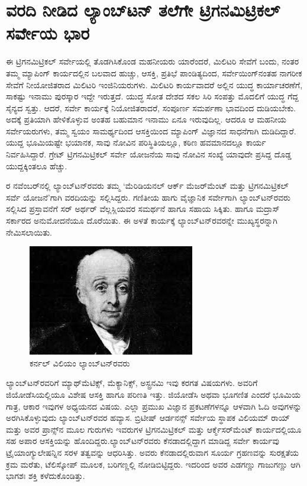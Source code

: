 
\chapter{ವರದಿ ನೀಡಿದ ಲ್ಯಾಂಬ್​ಟನ್​ ತಲೆಗೇ ಟ್ರಿಗನಮಿಟ್ರಿಕಲ್​ ಸರ್ವೇಯ ಭಾರ}

ಈ ಟ್ರಿಗನಮಿಟ್ರಿಕಲ್​ ಸರ್ವೇಯಲ್ಲಿ ತೊಡಗಿಸಿಕೊಂಡ ಮಹನೀಯರು ಯಾರೆಂದರೆ, ಮಿಲಿಟರಿ ಸೇವೆಗೆ ಬಂದು, ನಂತರ ತಮ್ಮ ಮ್ಯಾಪಿಂಗ್​ ಕಾರ್ಯದಲ್ಲಿನ ಬಲವಾದ ಹುಚ್ಚು, ಆಸಕ್ತಿ, ಪ್ರತಿಭೆ ಪಾಂಡಿತ್ಯದಿಂದ, ಸರ್ವೇಯಿಂಗ್​ನಂತಹ ನಾಗರೀಕ ಸೇವೆಗೆ ನೀಯೋಜಿತರಾದ ಮಿಲಿಟರಿ ಇಂಜಿನಿಯರುಗಳು. ಮಿಲಿಟರಿ ಕಾರ್ಯವಾದರೆ ಅಲ್ಲಿನ ಯುದ್ಧ ಕಾರ್ಯಾಚರಣೆಗೆ, ಸಾಕಷ್ಟು ಇನಾಮು ಪುರಸ್ಕಾರ ಇದ್ದೇ ಇರುತ್ತದೆ. ಯುದ್ಧ ಸೋತ ದೇಶದ ಸಕಲ ಸಿರಿ ಸಂಪತ್ತು ಮೊದಲಿಗೆ ಯುದ್ಧ ಗೆದ್ದ ಸೈನ್ಯದ ಸ್ವತ್ತು. ಆದರೆ, ಸರ್ವೇ ಕಾರ್ಯಕ್ಕೆ ನಿಯೋಜಿತರಾದರೆ, ಸಂಪೂರ್ಣ ಸಮರ್ಪಣಾ ಭಾವದಿಂದ ದುಡಿಯಬೇಕು. ಅದಕ್ಕೆ ಪ್ರತಿಯಾಗಿ ಹೇಳಿಕೊಳ್ಳುವ ಅಂತಹ ಬಹುಮಾನ ಇನಾಮು ಏನೂ ಇರುವುದಿಲ್ಲ. ಆದರೂ ಆ ಮಹನೀಯ ಸರ್ವೇಯರುಗಳು, ತಮ್ಮ ಸ್ವಯಂ ಸಾಮರ್ಥ್ಯದಿಂದ ಆಸಕ್ತಿಯಿಂದ ಮ್ಯಾಪಿಂಗ್​ ವಿಜ್ಞಾನದ ಸಾಧನೆಗಾಗಿ ದುಡಿದಿದ್ದಾರೆ. ಯುದ್ದ ಭೂಮಿಯಷ್ಟೇ ಭಯಾನಕ, ಸಾವು ನೋವಿನ ಪರಿಸ್ಥಿತಿಯಲ್ಲೂ, ಕಠಿಣ ಹವಮಾನದಲ್ಲೂ ಕಾರ್ಯ ನಿರ್ವಹಿಸಿದ್ದಾರೆ. ಗ್ರೇಟ್​ ಟ್ರಿಗನಮಿಟ್ರಿಕಲ್​ ಸರ್ವೇ ಯೋಜನೆಯ ಸಾವು ನೋವಿನ ಸಂಖ್ಯೆ ಯಾವುದೇ ಪ್ರಸಿದ್ದ ದೊಡ್ಡ ಯುದ್ದಕ್ಕಿಂತಲೂ ಹೆಚ್ಚು.

ರ ನವೆಂಬರ್​ನಲ್ಲಿ ಲ್ಯಾಂಬ್​ಟನ್​ರವರು ತಮ್ಮ ‘ಮೆರಿಡಿಯನಲ್​ ಆರ್ಕ್ ಮೆಜರ್\break ​ಮೆಂಟ್​ ಮತ್ತು ಟ್ರಿಗನಮಿಟ್ರಿಕಲ್​ ಸರ್ವೆ ಯೋಜನೆ’ಗಾಗಿ ವರದಿಯನ್ನು ಸಲ್ಲಿಸಿದ್ದರು. ಗಣಿತೀಯ ಹಾಗು ವೈಜ್ಞಾನಿಕ ಸರ್ವೇಗಾಗಿ ಲ್ಯಾಂಬ್​ಟನ್​ರವರು ಸಲ್ಲಿಸಿದ ಪ್ರಸ್ತಾವನೆಗೆ ಸರ್​ ಅರ್ಥರ್​ ವೆಲ್ಲಸ್ಲಿಯವರ ಸಮರ್ಥನೆ ಹಾಗೂ ಸಹಾಯ ಸಿಕ್ಕಿತು. ಹಾಗೂ ಮದ್ರಾಸ್​ ಸರ್ಕಾರದ ಅನುಮೋದನೆಯೂ ದೊರೆಯಿತು. ಈ ಅಳತೆ ಕಾರ್ಯಕ್ಕೆ ಲ್ಯಾಂಬ್​ಟನ್​ರವರನ್ನೇ ಮುಖ್ಯಸ್ಥರನ್ನಾಗಿ ನೇಮಿಸಲಾಯಿತು.

\begin{figure}[!htbp]
\includegraphics[scale=1.4]{"images/image005.jpg"}
\caption{ಕರ್ನಲ್​ ವಿಲಿಯಂ ಲ್ಯಾಂಬ್​ಟನ್​ರವರು}\label{chap4-fig1}
\end{figure}

ಲ್ಯಾಂಬ್​ಟನ್​ರವರಿಗೆ ಮ್ಯಾಥ್​ಮೆಟಿಕ್ಸ್​, ಮೆಕ್ಯಾನಿಕ್ಸ್​, ಅಸ್ಟ್ರನಮಿ ಇವು ಕರಗತ ವಿಷಯಗಳು. ಅವರಿಗೆ ಜಿಯೋಡೆಸಿಯಲ್ಲಿಯೂ ವಿಶೇಷ ಆಸಕ್ತಿ ಹಾಗೂ ಪರಿಣತಿ ಇತ್ತು. ಜಿಯೋಡೆಸಿ ಅಥವಾ ಭೂಗಣಿತ ಎಂದರೆ ಭೂಮಿಯ ಗಾತ್ರ, ಆಕಾರ ಇವುಗಳ ಅಧ್ಯಯನದ ವಿಷಯ. ಎಲ್ಲಾ ಪ್ರಮುಖ ವಿಜ್ಞಾನ ಪ್ರಕಟಣೆಗಳನ್ನೂ ಆಳವಾಗಿ ಓದಿ ಅವುಗಳನ್ನು ಅರಗಿಸಿಕೊಳ್ಳುವುದು ಲ್ಯಾಂಬ್​ಟನ್​ರವರ ಹವ್ಯಾಸ. ಬ್ರಿಟೀಷ್​ ಆರ್ಡನನ್ಸ್​ ಸರ್ವೇಯ ಸ್ಥಾಪಕ ವಿಲಿಯಮ್ ರಾಯ್​\break ಮತ್ತು ಅವರ ಪ್ರಾನ್ಸ್​ನ ಮೂಲ ಗುರುಗಳು ಇವರುಗಳ ಟ್ರಿಗನಮಿಟ್ರಿಕಲ್​ ಮತ್ತು ಆರ್ಕ್\break ಮೆಸರ್​ಮೆಂಟ್​ ಕಾರ್ಯದಲ್ಲಿಯೂ ಸಹ ಅಪಾರ ಆಸಕ್ತಿಯನ್ನು ಹೊಂದಿದ್ದರು.\break ಲ್ಯಾಂಬ್​ಟನ್​ರವರು ಕೆನಡಾದಲ್ಲಿದ್ದಾಗ ಮಾಡಿದ್ದ ಸರ್ವೇ ಕಾರ್ಯವು ಟ್ರೈಯಾಂಗ್ಯುಲೇಷನ್ನಿನ ಸರಳ ತತ್ವವನ್ನು ಆಧರಿಸಿತ್ತು. ಅವರು ಕೆನಡಾದಲ್ಲಿರುವಾಗ ಸೂರ್ಯ ಗ್ರಹಣವನ್ನು ಸುರಕ್ಷತೆಯ ಕ್ರಮ ಮರೆತು, ಟೆಲಿಸ್ಕೋಪ್​ ಮೂಲಕ, ಬರಿಗಣ್ಣಲ್ಲಿ ನೋಡಿಬಿಟ್ಟಿದ್ದರು. ಇದರಿಂದ ಅವರ ಎಡಗಣ್ಣು ಗಾಜುಗಣ್ಣು ಆಗಿ ಭಾಗಶಃ ಶಕ್ತಿ ಕಳೆದುಕೊಂಡಿತ್ತು.

